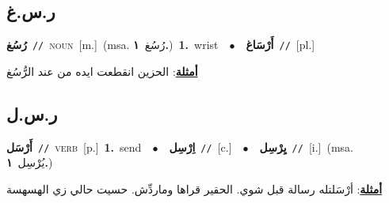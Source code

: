 \documentclass[10pt,a4paper,twoside]{article} %
\begin{document}
\begin{multicols}{2}
\vspace{-3mm}
\subsection*{\color{blue}\foreignlanguage{arabic}{ر.س.غ}\color{blue}{}} 

{\setlength\topsep{0pt}\textbf{\foreignlanguage{arabic}{رُسُغ}}\ {\color{gray}\texttt{//}\color{black}}\ \textsc{noun}\ [m.]\ \color{gray}(msa. \foreignlanguage{arabic}{رُسُغ}~\foreignlanguage{arabic}{\textbf{١.}})\color{black}\ \textbf{1.}~wrist\ \ $\bullet$\ \ \setlength\topsep{0pt}\textbf{\foreignlanguage{arabic}{أَرْسَاغ}}\ {\color{gray}\texttt{//}\color{black}}\ [pl.]\  \begin{flushright}\color{gray}\foreignlanguage{arabic}{\textbf{\underline{\foreignlanguage{arabic}{أمثلة}}}: الحزين انقطعت ايده من عند الرُّسُغ}\end{flushright}\color{black}} \vspace{2mm}

\vspace{-3mm}
\subsection*{\color{blue}\foreignlanguage{arabic}{ر.س.ل}\color{blue}{}} 

{\setlength\topsep{0pt}\textbf{\foreignlanguage{arabic}{أَرْسَل}}\ {\color{gray}\texttt{//}\color{black}}\ \textsc{verb}\ [p.]\ \textbf{1.}~send\ \ $\bullet$\ \ \setlength\topsep{0pt}\textbf{\foreignlanguage{arabic}{اِرْسِل}}\ {\color{gray}\texttt{//}\color{black}}\ [c.]\ \ $\bullet$\ \ \setlength\topsep{0pt}\textbf{\foreignlanguage{arabic}{يِرْسِل}}\ {\color{gray}\texttt{//}\color{black}}\ [i.]\ \color{gray}(msa. \foreignlanguage{arabic}{يُرْسِل}~\foreignlanguage{arabic}{\textbf{١.}})\color{black}\  \begin{flushright}\color{gray}\foreignlanguage{arabic}{\textbf{\underline{\foreignlanguage{arabic}{أمثلة}}}: أرْسَلتله رسالة قبل شوي. الحقير قراها وماردِّش. حسيت حالي زي الهسهسة}\end{flushright}\color{black}} \vspace{2mm}


\end{multicols}
\end{document}
